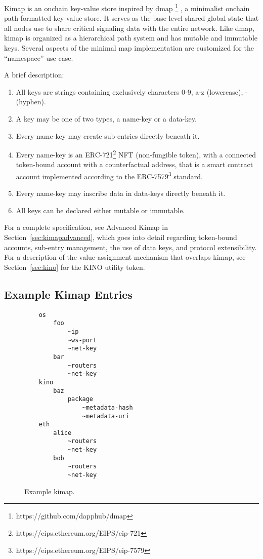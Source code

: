 \documentclass[runningheads]{llncs}
\begin{document}
Kimap is an onchain key-value store inspired by dmap
\footnote{https://github.com/dapphub/dmap}
, a minimalist onchain path-formatted key-value store.
It serves as the base-level shared global state that all nodes use to share critical signaling data with the entire network.
Like dmap, kimap is organized as a hierarchical path system and has mutable and immutable keys.
Several aspects of the minimal map implementation are customized for the ``namespace'' use case.

A brief description:

\begin{enumerate}
    \item All keys are strings containing exclusively characters 0-9, a-z (lowercase), - (hyphen).
    \item A key may be one of two types, a name-key or a data-key.
    \item Every name-key may create sub-entries directly beneath it.
    \item Every name-key is an ERC-721\footnote{https://eips.ethereum.org/EIPS/eip-721} NFT (non-fungible token),
    with a connected token-bound account with a counterfactual address,
    that is a smart contract account implemented according to the ERC-7579\footnote{https://eips.ethereum.org/EIPS/eip-7579} standard.
    \item Every name-key may inscribe data in data-keys directly beneath it.
    \item All keys can be declared either mutable or immutable.
\end{enumerate}

For a complete specification, see Advanced Kimap in Section~\ref{sec:kimapadvanced}, which goes into detail regarding token-bound accounts, sub-entry management, the use of data keys, and protocol extensibility.
For a description of the value-assignment mechanism that overlaps kimap, see Section~\ref{sec:kino} for the KINO utility token.

\subsection{Example Kimap Entries}

\begin{figure}[H]
    \centering
    \begin{verbatim}
    os
        foo
            ~ip
            ~ws-port
            ~net-key
        bar
            ~routers
            ~net-key
    kino
        baz
            package
                ~metadata-hash
                ~metadata-uri
    eth
        alice
            ~routers
            ~net-key
        bob
            ~routers
            ~net-key
    \end{verbatim}
    \caption{Example kimap.}
    \label{fig:example kimap}
\end{figure}
\end{document}
